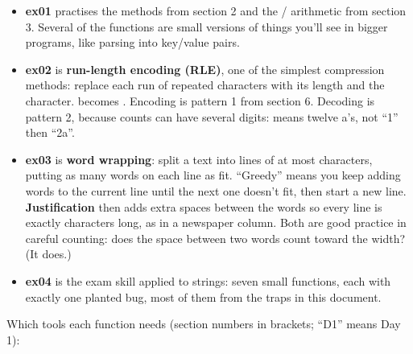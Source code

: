 \documentclass[10pt,a4paper]{article}
\begin{document}
\begin{itemize}
\item \textbf{ex01} practises the methods from section 2 and the / arithmetic from section 3. Several of the functions are small versions of things you’ll see in bigger programs, like parsing  into key/value pairs.
\item \textbf{ex02} is \textbf{run-length encoding (RLE)}, one of the simplest compression methods: replace each run of repeated characters with its length and the character.  becomes . Encoding is pattern 1 from section 6. Decoding is pattern 2, because counts can have several digits:  means twelve a’s, not “1” then “2a”.
\item \textbf{ex03} is \textbf{word wrapping}: split a text into lines of at most  characters, putting as many words on each line as fit. “Greedy” means you keep adding words to the current line until the next one doesn’t fit, then start a new line. \textbf{Justification} then adds extra spaces between the words so every line is exactly  characters long, as in a newspaper column. Both are good practice in careful counting: does the space between two words count toward the width? (It does.)
\item \textbf{ex04} is the exam skill applied to strings: seven small functions, each with exactly one planted bug, most of them from the traps in this document.
\end{itemize}
Which tools each function needs (section numbers in brackets; “D1” means Day 1):
\end{document}
